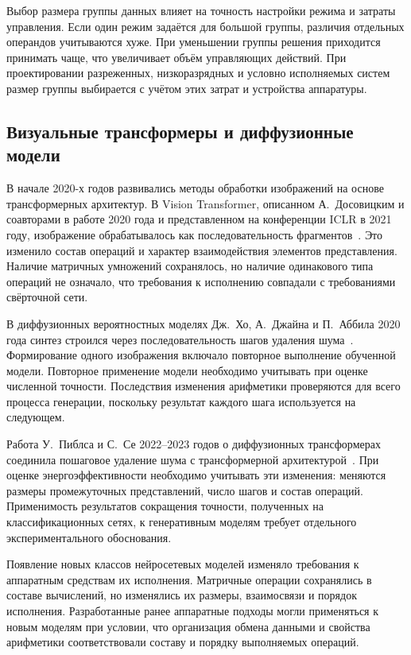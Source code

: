 Выбор размера группы данных влияет на точность настройки режима и затраты
управления. Если один режим задаётся для большой группы, различия отдельных
операндов учитываются хуже. При уменьшении группы решения приходится принимать
чаще, что увеличивает объём управляющих действий. При проектировании разреженных,
низкоразрядных и условно исполняемых систем размер группы
выбирается с учётом этих затрат и устройства аппаратуры.

\subsection{Визуальные трансформеры и диффузионные модели}

В начале 2020-х годов развивались методы обработки изображений
на основе трансформерных архитектур. В Vision Transformer,
описанном А.~Досовицким и соавторами в работе 2020 года
и представленном на конференции ICLR в 2021 году, изображение обрабатывалось
как последовательность фрагментов~\cite{vit2021}.
Это изменило состав операций и характер взаимодействия элементов
представления. Наличие матричных умножений сохранялось,
но наличие одинакового типа операций не означало, что требования к исполнению
совпадали с требованиями свёрточной сети.

В диффузионных вероятностных моделях Дж.~Хо, А.~Джайна
и П.~Аббила 2020 года синтез строился через последовательность
шагов удаления шума~\cite{ho2020}. Формирование одного
изображения включало повторное выполнение обученной модели.
Повторное применение модели необходимо учитывать при оценке численной
точности. Последствия изменения арифметики проверяются для всего процесса
генерации, поскольку результат каждого шага используется на следующем.

Работа У.~Пиблса и С.~Се 2022--2023 годов о диффузионных
трансформерах соединила пошаговое удаление шума с трансформерной архитектурой~\cite{dit2023}. При оценке энергоэффективности необходимо учитывать эти изменения: меняются размеры
промежуточных представлений, число шагов и состав операций.
Применимость результатов сокращения точности, полученных
на классификационных сетях, к генеративным моделям требует
отдельного экспериментального обоснования.

Появление новых классов нейросетевых моделей изменяло требования к аппаратным
средствам их исполнения.
Матричные операции сохранялись в составе вычислений,
но изменялись их размеры, взаимосвязи и порядок исполнения.
Разработанные ранее аппаратные подходы могли применяться к новым моделям при
условии, что организация обмена данными и свойства арифметики соответствовали
составу и порядку выполняемых операций.

